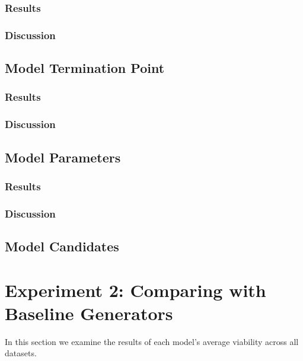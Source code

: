 \documentclass[12pt,a4paper]{report}
\begin{document}
\subsubsection{Results}

\subsubsection{Discussion}

\subsection{Model Termination Point}
\subsubsection{Results}

\subsubsection{Discussion}

\subsection{Model Parameters}
\subsubsection{Results}

\subsubsection{Discussion}

\subsection{Model Candidates}




\section{Experiment 2: Comparing with Baseline Generators}
\label{sec:experiment2}
In this section we examine the results of each model's average viability across all datasets. 
\end{document}
